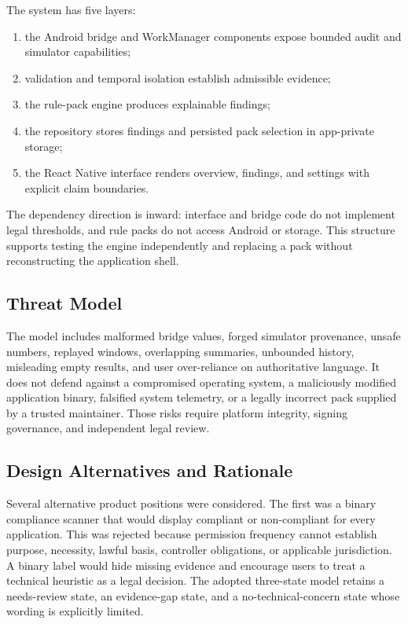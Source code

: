 The system has five layers:

\begin{enumerate}
    \item the Android bridge and WorkManager components expose bounded audit and simulator capabilities;
    \item validation and temporal isolation establish admissible evidence;
    \item the rule-pack engine produces explainable findings;
    \item the repository stores findings and persisted pack selection in app-private storage;
    \item the React Native interface renders overview, findings, and settings with explicit claim boundaries.
\end{enumerate}

The dependency direction is inward: interface and bridge code do not implement legal thresholds, and rule packs do not access Android or storage. This structure supports testing the engine independently and replacing a pack without reconstructing the application shell.

\subsection{Threat Model}

The model includes malformed bridge values, forged simulator provenance, unsafe numbers, replayed windows, overlapping summaries, unbounded history, misleading empty results, and user over-reliance on authoritative language. It does not defend against a compromised operating system, a maliciously modified application binary, falsified system telemetry, or a legally incorrect pack supplied by a trusted maintainer. Those risks require platform integrity, signing governance, and independent legal review.

\subsection{Design Alternatives and Rationale}

Several alternative product positions were considered. The first was a binary compliance scanner that would display compliant or non-compliant for every application. This was rejected because permission frequency cannot establish purpose, necessity, lawful basis, controller obligations, or applicable jurisdiction. A binary label would hide missing evidence and encourage users to treat a technical heuristic as a legal decision. The adopted three-state model retains a needs-review state, an evidence-gap state, and a no-technical-concern state whose wording is explicitly limited.

